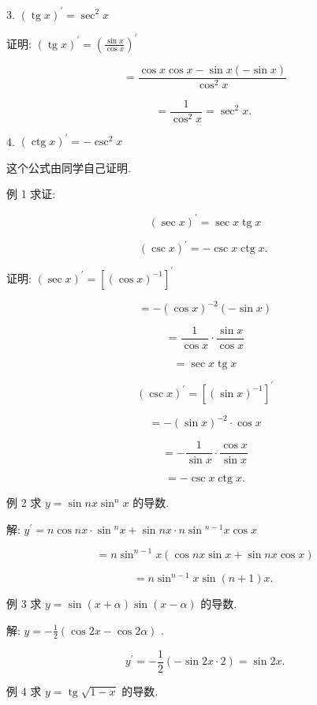\documentclass[10pt]{article}
\begin{document}
3. \({\left( \operatorname{tg}x\right) }^{\prime } = {\sec }^{2}x\)

证明: \({\left( \operatorname{tg}x\right) }^{\prime } = {\left( \frac{\sin x}{\cos x}\right) }^{\prime }\)

\[
= \frac{\cos x\cos x - \sin x\left( {-\sin x}\right) }{{\cos }^{2}x}
\]

\[
= \frac{1}{{\cos }^{2}x} = {\sec }^{2}x\text{. }
\]

4. \({\left( \operatorname{ctg}x\right) }^{\prime } = - {\csc }^{2}x\)

这个公式由同学自己证明.

例 1 求证:

\[
{\left( \sec x\right) }^{\prime } = \sec x\operatorname{tg}x
\]

\[
{\left( \csc x\right) }^{\prime } = - \csc x\operatorname{ctg}x\text{. }
\]

证明: \({\left( \sec x\right) }^{\prime } = {\left\lbrack {\left( \cos x\right) }^{-1}\right\rbrack }^{\prime }\)

\[
= - {\left( \cos x\right) }^{-2}\left( {-\sin x}\right)
\]

\[
= \frac{1}{\cos x} \cdot \frac{\sin x}{\cos x}
\]

\[
= \sec x\operatorname{tg}x
\]

\[
{\left( \csc x\right) }^{\prime } = {\left\lbrack {\left( \sin x\right) }^{-1}\right\rbrack }^{\prime }
\]

\[
= - {\left( \sin x\right) }^{-2} \cdot \cos x
\]

\[
= - \frac{1}{\sin x} \cdot \frac{\cos x}{\sin x}
\]

\[
= - \csc x\operatorname{ctg}x\text{.}
\]

例 2 求 \(y = \sin {nx}{\sin }^{n}x\) 的导数.

解: \({y}^{\prime } = n\cos {nx} \cdot \sin {}^{n}x + \sin {nx} \cdot n\sin {}^{n - 1}x\cos x\)

\[
= n{\sin }^{n - 1}x\left( {\cos {nx}\sin x + \sin {nx}\cos x}\right)
\]

\[
= n{\sin }^{n - 1}x\sin \left( {n + 1}\right) x\text{. }
\]

例 3 求 \(y = \sin \left( {x + \alpha }\right) \sin \left( {x - \alpha }\right)\) 的导数.

解: \(y = - \frac{1}{2}\left( {\cos {2x} - \cos {2\alpha }}\right)\) .

\[
{y}^{\prime } = - \frac{1}{2}\left( {-\sin {2x} \cdot 2}\right) = \sin {2x}.
\]

例 4 求 \(y = \operatorname{tg}\sqrt{1 - x}\) 的导数.
\end{document}
